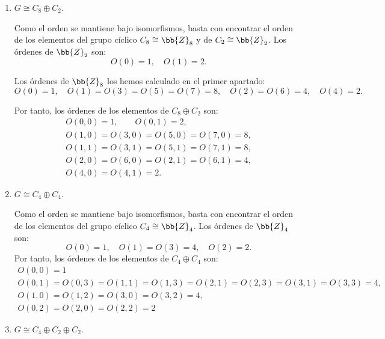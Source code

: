 \begin{ejercicio}
\begin{enumerate}
\begin{enumerate}
            \item $G \cong C_8 \oplus C_2$.
            
            Como el orden se mantiene bajo isomorfismos, basta con encontrar el orden de los elementos del grupo cíclico $C_8\cong \bb{Z}_8$ y de $C_2\cong \bb{Z}_2$.
            Los órdenes de $\bb{Z}_2$ son:
            \begin{equation*}
                O(0) = 1, \quad O(1) = 2.
            \end{equation*}

            Los órdenes de $\bb{Z}_8$ los hemos calculado en el primer apartado:
            \begin{equation*}
                O(0) = 1, \quad
                O(1) = O(3) = O(5) = O(7) = 8, \quad
                O(2) = O(6) = 4, \quad
                O(4) = 2.
            \end{equation*}

            Por tanto, los órdenes de los elementos de $C_8 \oplus C_2$ son:
            \begin{gather*}
                O(0, 0) = 1, \qquad O(0,1)= 2, \\
                O(1, 0) = O(3, 0) = O(5, 0) = O(7, 0) = 8, \\
                O(1, 1) = O(3, 1) = O(5, 1) = O(7, 1) = 8, \\
                O(2, 0) = O(6, 0) = O(2, 1) = O(6, 1) = 4, \\
                O(4, 0) = O(4, 1) = 2.
            \end{gather*}

            \item $G \cong C_4 \oplus C_4$.
            
            Como el orden se mantiene bajo isomorfismos, basta con encontrar el orden de los elementos del grupo cíclico $C_4\cong \bb{Z}_4$.
            Los órdenes de $\bb{Z}_4$ son:
            \begin{equation*}
                O(0) = 1, \quad O(1) = O(3) = 4, \quad O(2) = 2.
            \end{equation*}
            Por tanto, los órdenes de los elementos de $C_4 \oplus C_4$ son:
            \begin{gather*}
                O(0, 0) = 1\\
                O(0,1) = O(0,3) = O(1,1) = O(1,3) = O(2,1) = O(2,3) = O(3,1) = O(3,3) = 4, \\
                O(1,0) = O(1,2) = O(3,0) = O(3,2) = 4, \\
                O(0,2) = O(2,0) = O(2,2) = 2
            \end{gather*}
            \item $G \cong C_4 \oplus C_2 \oplus C_2$.
            

\end{enumerate}
\end{enumerate}
\end{ejercicio}
